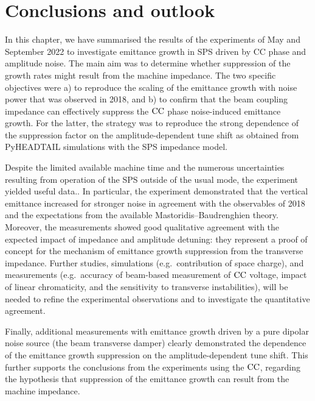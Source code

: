 \section{Conclusions and outlook}\label{sec:Ch8_conclusions}
In this chapter, we have summarised the results of the experiments of May and September 2022 to investigate emittance growth in SPS driven by CC phase and amplitude noise.  The main aim was to determine whether suppression of the growth rates might result from the machine impedance. The two specific objectives were a) to reproduce the scaling of the emittance growth with noise power that was observed in 2018, and b) to confirm that the beam coupling impedance can effectively suppress the ${\mathrm{CC}}$ phase noise-induced emittance growth. For the latter, the strategy was to reproduce the strong dependence of the suppression factor on the amplitude-dependent tune shift as obtained from PyHEADTAIL simulations with the SPS impedance model.

Despite the limited available machine time and the numerous uncertainties resulting from operation of the SPS outside of the usual mode, the experiment yielded useful data.. In particular, the experiment demonstrated that the vertical emittance increased for stronger noise in agreement with the observables of 2018 and the expectations from the available Mastoridis--Baudrenghien theory. Moreover, the measurements showed good qualitative agreement with the expected impact of impedance and amplitude detuning: they represent a proof of concept for the mechanism of emittance growth suppression from the transverse impedance. Further studies, simulations (e.g.~contribution of space charge), and measurements (e.g.~accuracy of beam-based measurement of ${\mathrm{CC}}$ voltage, impact of linear chromaticity, and the sensitivity to transverse instabilities), will be needed to refine the experimental observations and to investigate the quantitative agreement. 

Finally, additional measurements with emittance growth driven by a pure dipolar noise source (the beam transverse damper) clearly demonstrated the dependence of the emittance growth suppression on the amplitude-dependent tune shift.  This further supports the conclusions from the experiments using the ${\mathrm{CC}}$, regarding the hypothesis that suppression of the emittance growth can result from the machine impedance.

